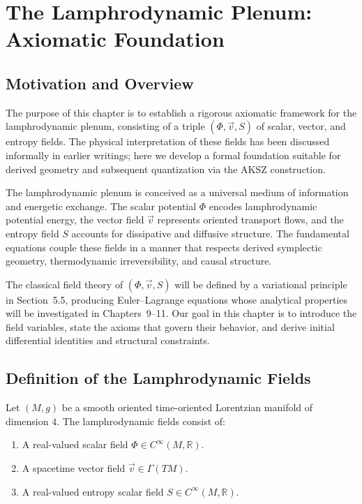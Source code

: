 \chapter{The Lamphrodynamic Plenum: Axiomatic Foundation}

\section{Motivation and Overview}

The purpose of this chapter is to establish a rigorous axiomatic framework
for the lamphrodynamic plenum, consisting of a triple
$(\Phi,\vec v,S)$ of scalar, vector, and entropy fields.
The physical interpretation of these fields has been discussed informally
in earlier writings; here we develop a formal foundation suitable for
derived geometry and subsequent quantization via the AKSZ construction.

The lamphrodynamic plenum is conceived as a universal medium
of information and energetic exchange.
The scalar potential $\Phi$ encodes lamphrodynamic potential energy,
the vector field $\vec v$ represents oriented transport flows, and
the entropy field $S$ accounts for dissipative and diffusive structure.
The fundamental equations couple these fields in a manner that respects
derived symplectic geometry, thermodynamic irreversibility, and
causal structure.

The classical field theory of $(\Phi,\vec v,S)$ will be defined by a
variational principle in Section~5.5, producing Euler--Lagrange
equations whose analytical properties will be investigated in
Chapters~9--11. Our goal in this chapter is to introduce the field
variables, state the axioms that govern their behavior, and derive
initial differential identities and structural constraints.


\section{Definition of the Lamphrodynamic Fields}

Let $(M,g)$ be a smooth oriented time-oriented Lorentzian manifold
of dimension $4$. The lamphrodynamic fields consist of:

\begin{enumerate}
\item A real-valued scalar field $\Phi \in C^{\infty}(M,\mathbb{R})$.
\item A spacetime vector field $\vec v \in \Gamma(TM)$.
\item A real-valued entropy scalar field $S \in C^{\infty}(M,\mathbb{R})$.
\end{enumerate}

